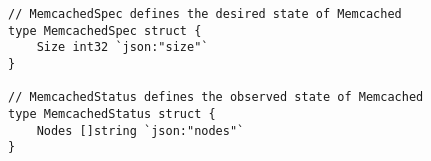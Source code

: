 \begin{verbatim}
// MemcachedSpec defines the desired state of Memcached
type MemcachedSpec struct {
    Size int32 `json:"size"`
}

// MemcachedStatus defines the observed state of Memcached
type MemcachedStatus struct {
    Nodes []string `json:"nodes"`
}
\end{verbatim}